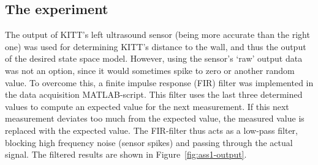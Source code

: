 \documentclass[11pt,titlepage]{report}
\begin{document}
\subsection{The experiment}
The output of KITT's left ultrasound sensor (being more accurate than the right one) was used for determining KITT's distance to the wall, and thus the output of the desired state space model. However, using the sensor's `raw' output data was not an option, since it would sometimes spike to zero or another random value. To overcome this, a finite impulse response (FIR) filter was implemented in the data acquisition MATLAB-script. This filter uses the last three determined values to compute an expected value for the next measurement. If this next measurement deviates too much from the expected value, the measured value is replaced with the expected value. The FIR-filter thus acts as a low-pass filter, blocking high frequency noise (sensor spikes) and passing through the actual signal.
The filtered results are shown in Figure~\ref{fig:ass1-output}.
\end{document}

